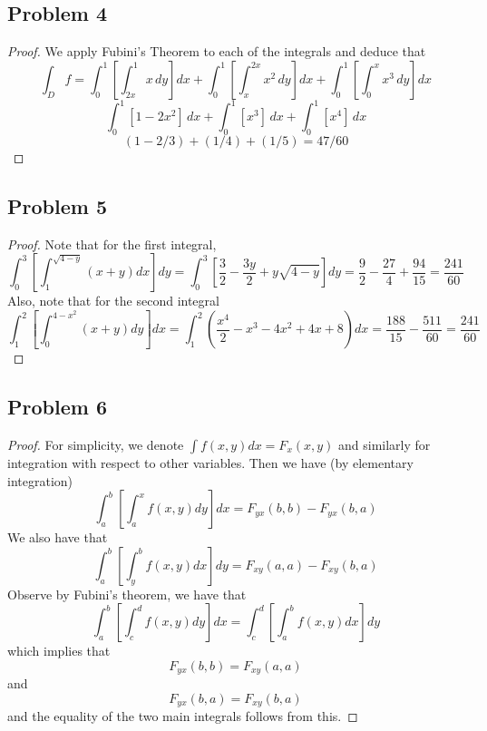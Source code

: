 \documentclass{article}
\begin{document}
\subsection*{Problem 4}

\begin{proof}
We apply Fubini's Theorem to each of the integrals and deduce that 
\[
      \int_D f = \int_0^1 \left[\int_{2x}^1 x \, dy\right] dx + \int_0^1\left[\int_{x}^{2x} x^2 \, dy \right] dx + \int_0^1\left[\int_{0}^{x} x^3 \, dy \right] dx \]
      \[ \int_0^1 [1-2x^2] \, dx + \int_0^1 [x^3] \, dx + \int_0^1 [x^4] \, dx \]
      \[ (1-2/3)+(1/4)+(1/5) = 47/60 \]
    
\end{proof}


\subsection*{Problem 5}

\begin{proof}
Note that for the first integral,
\[ \int_{0}^{3}\left[ \int_{1}^{\sqrt{4-y}}(x + y) dx\right]dy = \int_{0}^{3} \left[ \frac{3}{2} - \frac{3y}{2} + y\sqrt{4 - y}\right] dy = \frac{9}{2} - \frac{27}{4} + \frac{94}{15} = \frac{241}{60}\]
Also, note that for the second integral
\[ \int_{1}^{2} \left[ \int_{0}^{4-x^2} (x + y) dy \right] dx = \int_{1}^{2} \left( \frac{x^4}{2} - x^3 - 4x^2 + 4x + 8 \right) dx = \frac{188}{15} - \frac{511}{60} = \frac{241}{60}\]
\end{proof}

\subsection*{Problem 6}

\begin{proof}
For simplicity, we denote $\int f(x, y) dx = F_x(x, y)$ and similarly for integration with respect to other variables. Then we have (by elementary integration)
\[ \int_a^b \left[ \int_a^x f(x, y) dy\right] dx = F_{yx}(b, b) - F_{yx}(b, a)\]
We also have that
\[ \int_a^b \left[ \int_y^b f(x, y) dx\right] dy = F_{xy}(a, a) - F_{xy}(b, a)\]
Observe by Fubini's theorem, we have that
\[ \int_a^b \left[ \int_c^d f(x, y) dy\right] dx = \int_c^d \left[ \int_a^b f(x, y) dx\right] dy\]
which implies that
\[ F_{yx}(b, b) = F_{xy}(a, a)\]
and
\[ F_{yx}(b, a) = F_{xy}(b, a)\]
and the equality of the two main integrals follows from this.
\end{proof}
\end{document}
